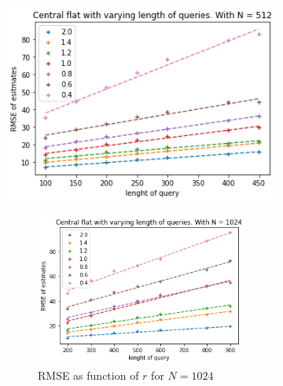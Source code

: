 \documentclass[11pt]{article}
\theoremstyle{definition}
\begin{document}
\begin{figure}[H]
\begin{subfigure}{.4\textwidth}
  \includegraphics[width=\linewidth]{figures/central_flat/varying_r/cen_flat_varying_length_N_linear_=512.png}
  \caption{RMSE as function of $r$ for $N=512$}
  \label{fig:a}
  \begin{subfigure}{\textwidth}
  \centering
  \includegraphics[width=\linewidth]{figures/central_flat/varying_r/cen_flat_varying_length_N_linear_=1024.png}
  \caption{RMSE as function of $r$ for $N=1024$}
  \label{fig:a}
\end{subfigure}
\begin{subfigure}{\textwidth}
  \centering

\end{subfigure}
\end{subfigure}
\end{figure}
\end{document}
